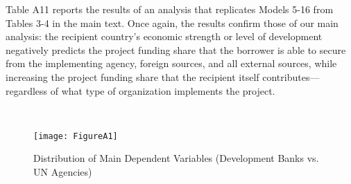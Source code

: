 \documentclass{article}
\begin{document}
Table A11 reports the results of an analysis that replicates Models 5-16 from Tables 3-4 in the main text.  Once again, the results confirm those of our main analysis: the recipient country’s economic strength or level of development negatively predicts the project funding share that the borrower is able to secure from the implementing agency, foreign sources, and all external sources, while increasing the project funding share that the recipient itself contributes---regardless of what type of organization implements the project.

\

\begin{figure}[H]
	\centering
	\caption{Distribution of Main Dependent Variables (Development Banks vs. UN Agencies)}
	\texttt{[image: FigureA1]}
	\label{fig:figureA1}
\end{figure}
\end{document}
